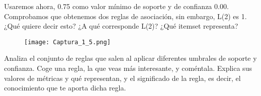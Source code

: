 \documentclass[11pt]{exam}
\begin{document}
\begin{questions}



{\question Usaremos ahora, 0.75 como valor mínimo de soporte y de confianza 0.00. Comprobamos que obtenemos dos reglas de asociación, sin embargo, L(2) es 1. ¿Qué quiere decir esto? ¿A qué corresponde L(2)? ¿Qué itemset representa?}

\begin{figure}[h]
\centering
\texttt{[image: Captura\_1\_5.png]}
\end{figure}

{\question Analiza el conjunto de reglas que salen al aplicar diferentes umbrales de soporte y confianza. Coge una regla, la que veas más interesante, y coméntala. Explica sus valores de métricas y qué representan, y el significado de la regla, es decir, el conocimiento que te aporta dicha regla.}

\end{questions}
\end{document}
